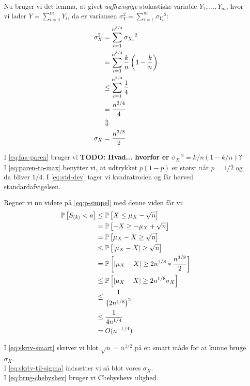 Nu bruger vi det lemma, at givet \emph{uafhængige} stokastiske variable $Y_1, ..., Y_m$, hvor vi lader $Y = \sum_{i=1}^m Y_i$, da er variansen $\sigma_Y^2 = \sum_{i=1}^m {\sigma_{Y_i}}^2$:
\begin{align}
  \sigma_X^2 &= \sum_{i=1}^{n^{3/4}} {\sigma_{X_i}}^2 \nonumber \\
  &= \sum_{i=1}^{n^{3/4}} \frac{k}{n} \left(  1 - \frac{k}{n}  \right) \label{eq:faa-paren} \\
  &\leq \sum_{i=1}^{n^{3/4}} \frac{1}{4} \label{eq:paren-to-max} \\
  &= \frac{n^{3/4}}{4} \nonumber \\
  &\Updownarrow \nonumber \\
  \sigma_X &= \frac{n^{3/8}}{2} \label{eq:std-dev}
\end{align}

I \cref{eq:faa-paren} bruger vi \textbf{TODO: Hvad... hvorfor er ${\sigma_{X_i}}^2 = k/n(1 - k/n)$?}\\
I \cref{eq:paren-to-max} benytter vi, at udtrykket $p(1 - p)$ er størst når $p = 1/2$ og da bliver $1/4$.
I \cref{eq:std-dev} tager vi kvadratroden og får herved standardafvigelsen.

Regner vi nu videre på \cref{eq:p-simpel} med denne viden får vi:
\begin{align}
  \mathbb{P} \left[  S_{(k)} < a  \right] &\leq \mathbb{P} \left[  X \leq \mu_X - \sqrt{n}  \right] \nonumber \\
  &= \mathbb{P} \left[  -X \geq -\mu_X + \sqrt{n}  \right] \nonumber \\
  &= \mathbb{P} \left[  \mu_X - X \geq \sqrt{n}  \right] \nonumber \\
  &\leq \mathbb{P} \left[  |\mu_X - X| \geq \sqrt{n}  \right]  \nonumber \\
  &= \mathbb{P} \left[  |\mu_X - X| \geq 2n^{1/8} * \frac{n^{3/8}}{2}    \right] \label{eq:skriv-smart} \\
  &\leq \mathbb{P} \left[   |\mu_X - X| \geq 2n^{1/8} \sigma_X   \right] \label{eq:skriv-til-sigma} \\
  &\leq \frac{1}{\left( 2n^{1/8} \right)^2} \label{eq:brug-chebyshev} \\
  &\leq \frac{1}{4n^{1/4}} \nonumber \\
  &= O(n^{-1/4}) \nonumber
\end{align}

I \cref{eq:skriv-smart} skriver vi blot $\sqrt{n} = n^{1/2}$ på en smart måde for at kunne bruge $\sigma_X$.\\
I \cref{eq:skriv-til-sigma} indsætter vi så blot vores $\sigma_X$.\\
I \cref{eq:brug-chebyshev} bruger vi Chebyshevs ulighed.
